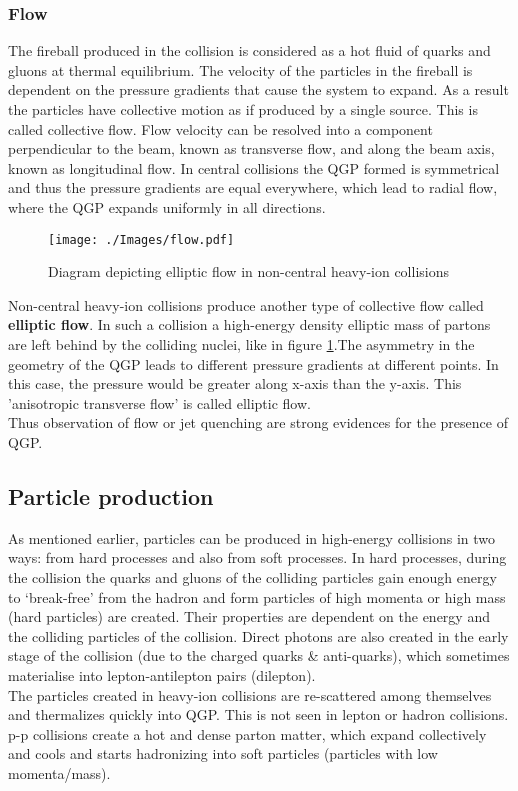 \documentclass[12pt,a4paper,twoside]{report}
\begin{document}
\subsubsection{Flow}
The fireball produced in the collision is considered as a hot fluid of quarks and gluons at thermal equilibrium. The velocity of the particles in the fireball is dependent on the pressure gradients that cause the system to expand. As a result the particles have collective motion as if produced by a single source. This is called collective flow. Flow velocity can be resolved into a component perpendicular to the beam, known as transverse flow, and along the beam axis, known as longitudinal flow. In central collisions the QGP formed is symmetrical and thus the pressure gradients are equal everywhere, which lead to radial flow, where the QGP expands uniformly in all directions.\\
\begin{figure}
	\centering
	\texttt{[image: ./Images/flow.pdf]}
	\caption{\label{fig:elliptic-flow}Diagram depicting elliptic flow in non-central heavy-ion collisions}
\end{figure}
Non-central heavy-ion collisions produce another type of collective flow called \textbf{elliptic flow}. In such a collision a high-energy density elliptic mass of partons are left behind by the colliding nuclei, like in figure \ref{fig:elliptic-flow}.The asymmetry in the geometry of the QGP leads to different pressure gradients at different points. In this case, the pressure would be greater along x-axis than the y-axis. This 'anisotropic transverse flow' is called elliptic flow.\\

Thus observation of flow or jet quenching are strong evidences for the presence of QGP.
\subsection{Particle production}
As mentioned earlier, particles can be produced in high-energy collisions in two ways: from hard processes and also from soft processes. In hard processes, during the collision the quarks and gluons of the colliding particles gain enough energy to `break-free' from the hadron and form particles of high momenta or high mass (hard particles) are created. Their properties are dependent on the energy and the colliding particles of the collision. Direct photons are also created in the early stage of the collision (due to the charged quarks \& anti-quarks), which sometimes materialise into lepton-antilepton pairs (dilepton).\\
The particles created in heavy-ion collisions are re-scattered among themselves and thermalizes quickly into QGP. This is not seen in lepton or hadron collisions. p-p collisions create a hot and dense parton matter, which expand collectively and cools and starts hadronizing into soft particles (particles with low momenta/mass). \cite{Ref:Pproduction}
\end{document}
